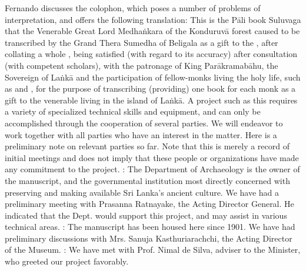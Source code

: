 {}Fernando discusses the colophon, which poses a number of problems of interpretation, and offers the following translation:\markdownRendererInterblockSeparator
{}\markdownRendererBlockQuoteBegin
This is the Pāli book Suluvaga that the Venerable Great Lord Medhaṅkara of the Konduruvā forest caused to be transcribed by the Grand Thera Sumedha of Beligala as a gift to the , after collating a whole , being satisfied (with regard to its accuracy) after consultation (with competent scholars), with the patronage of King Parākramabāhu, the Sovereign of Laṅkā and the participation of fellow-monks living the holy life, such as  and , for the purpose of transcribing (providing) one book for each monk as a gift to the venerable  living in the island of Laṅkā.
\markdownRendererBlockQuoteEnd \markdownRendererInterblockSeparator
{}\markdownRendererInterblockSeparator
{}A project such as this requires a variety of specialized technical skills and equipment, and can only be accomplished through the cooperation of several parties. We will endeavor to work together with all parties who have an interest in the matter. Here is a preliminary note on relevant parties so far. Note that this is merely a record of initial meetings and does not imply that these people or organizations have made any commitment to the project.\markdownRendererInterblockSeparator
{}\markdownRendererOlBegin
{}: The Department of Archaeology is the owner of the manuscript, and the governmental institution most directly concerned with preserving and making available Sri Lanka’s ancient culture. We have had a preliminary meeting with Prasanna Ratnayake, the Acting Director General. He indicated that the Dept. would support this project, and may assist in various technical areas.\markdownRendererOlItemEnd 
{}: The manuscript has been housed here since 1901. We have had preliminary discussions with Mrs. Sanuja Kasthuriarachchi, the Acting Director of the Museum.\markdownRendererOlItemEnd 
{}: We have met with Prof. Nimal de Silva, adviser to the Minister, who greeted our project favorably.\markdownRendererOlItemEnd 
